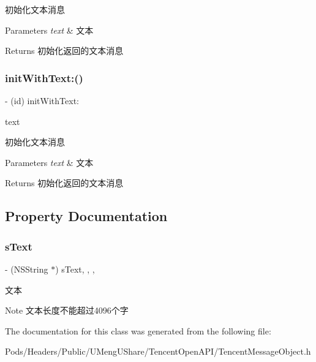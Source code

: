 初始化文本消息 
\begin{DoxyParams}{Parameters}
{\em text} & 文本 \\
\hline
\end{DoxyParams}
\begin{DoxyReturn}{Returns}
初始化返回的文本消息 
\end{DoxyReturn}
\mbox{\label{interface_tencent_text_message_obj_v1_aa5a6585b478714ee95b9a3f9b5ca008c}} 
\subsubsection{\texorpdfstring{init\+With\+Text\+:()}{initWithText:()}\hspace{0.1cm}{\footnotesize\ttfamily [2/2]}}
{\footnotesize\ttfamily -\/ (id) init\+With\+Text\+: \begin{DoxyParamCaption}\item[{(N\+S\+String $\ast$)}]{text }\end{DoxyParamCaption}}

初始化文本消息 
\begin{DoxyParams}{Parameters}
{\em text} & 文本 \\
\hline
\end{DoxyParams}
\begin{DoxyReturn}{Returns}
初始化返回的文本消息 
\end{DoxyReturn}


\subsection{Property Documentation}
\mbox{\label{interface_tencent_text_message_obj_v1_ab1064daef652b66656d0d97f35528205}} 
\subsubsection{\texorpdfstring{s\+Text}{sText}}
{\footnotesize\ttfamily -\/ (N\+S\+String $\ast$) s\+Text\hspace{0.3cm}{\ttfamily [read]}, {\ttfamily [write]}, {\ttfamily [nonatomic]}, {\ttfamily [retain]}}

文本 \begin{DoxyNote}{Note}
文本长度不能超过4096个字 
\end{DoxyNote}


The documentation for this class was generated from the following file\+:\begin{DoxyCompactItemize}
\item 
Pods/\+Headers/\+Public/\+U\+Meng\+U\+Share/\+Tencent\+Open\+A\+P\+I/Tencent\+Message\+Object.\+h\end{DoxyCompactItemize}
